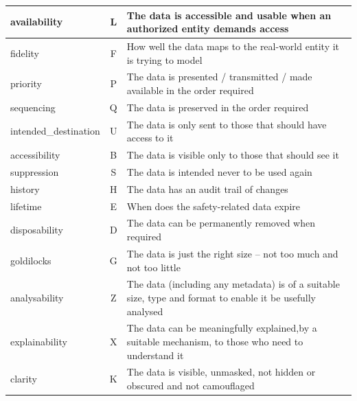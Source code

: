 \begin{longtable}{|L{}|C{}|L{}|}
	{\Gls{availability}} & L & {The data is accessible and usable when an authorized entity demands access}\\\hline
	{\Gls{fidelity}} & F & {How well the data maps to the real-world entity it is trying to model}\\\hline
	{\Gls{priority}} & P & {The data is presented / transmitted / made available in the order required}\\\hline
	{\Gls{sequencing}} & Q & {The data is preserved in the order required}\\\hline
	{\Gls{intended_destination}} & U & {The data is only sent to those that should have access to it}\\\hline
	{\Gls{accessibility}} & B & {The data is visible only to those that should see it}\\\hline
	{\Gls{suppression}} & S & {The data is intended never to be used again}\\\hline
	{\Gls{history}} & H & {The data has an audit trail of changes}\\\hline
	{\Gls{lifetime}} & E & {When does the safety-related data expire}\\\hline
	{\Gls{disposability}} & D & {The data can be permanently removed when required}\\\hline
	{\Gls{goldilocks}} & G & {The data is just the right size -- not too much and not too little}\\\hline
	{\Gls{analysability}} & Z & {The data (including any \gls{metadata}) is of a suitable size, type and format to enable it be usefully analysed}\\\hline
	{\Gls{explainability}} & X & {The data can be meaningfully explained,by a suitable mechanism, to those who need to understand it}\\\hline
	{\Gls{clarity}} & K & {The data is visible, unmasked, not hidden or obscured and not camouflaged}\\\hline
\end{longtable}

